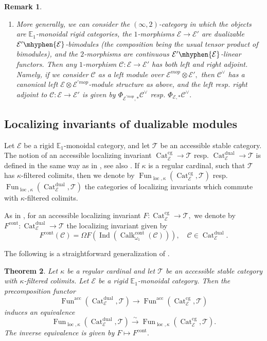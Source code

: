 \documentclass[11pt,leqno]{amsart}
\newtheorem{theo}{Theorem}[section]
\newtheorem{remark}[theo]{Remark}
\numberwithin{equation}{section}
\newcommand{\hy}{\mhyphen}
\newcommand{\xto}{\xrightarrow}
\newcommand{\Cat}{\operatorname{Cat}}
\newcommand{\loc}{\operatorname{loc}}
\newcommand{\cont}{\operatorname{cont}}
\newcommand{\acc}{\operatorname{acc}}
\newcommand{\cg}{\operatorname{cg}}
\newcommand{\dual}{\operatorname{dual}}
\newcommand{\bE}{{\mathbb E}}
\newcommand{\cC}{{\mathcal C}}
\newcommand{\cE}{{\mathcal E}}
\newcommand{\cT}{{\mathcal T}}
\newcommand{\Fun}{\operatorname{Fun}}
\newcommand{\Ind}{\operatorname{Ind}}
\newcommand{\Calk}{\operatorname{Calk}}
\begin{document}
\begin{remark}
\begin{enumerate}[label=(\roman*),ref=(\roman*)]
\item More generally, we can consider the $(\infty,2)$-category in which the objects are $\bE_1$-monoidal rigid categories, the $1$-morphisms $\cE\to\cE'$ are dualizable $\cE'\hy\cE$-bimodules (the composition being the usual tensor product of bimodules), and the $2$-morphisms are continuous $\cE'\hy\cE$-linear functors. Then any $1$-morphism $\cC:\cE\to\cE'$ has both left and right adjoint. Namely, if we consider $\cC$ as a left module over $\cE^{mop}\otimes\cE',$ then $\cC^{\vee}$ has a canonical left $\cE\otimes\cE^{'mop}$-module structure as above, and the left resp. right adjoint to $\cC:\cE\to\cE'$ is given by $\Phi_{\cE^{'mop},*}\cC^{\vee}$ resp. $\Phi_{\cE,*}\cC^{\vee}.$  
\end{enumerate}
\end{remark}

\subsection{Localizing invariants of dualizable modules}

Let $\cE$ be a rigid $\bE_1$-monoidal category, and let $\cT$ be an accessible stable category. The notion of an accessible localizing invariant $\Cat_{\cE}^{\cg}\to \cT$ resp. $\Cat_{\cE}^{\dual}\to\cT$ is defined in the same way as in \cite{BGT}, see also \cite[Section 4]{E24}. If $\kappa$ is a regular cardinal, such that $\cT$ has $\kappa$-filtered colimits, then we denote by $\Fun_{\loc,\kappa}(\Cat_{\cE}^{\cg},\cT)$ resp. $\Fun_{\loc,\kappa}(\Cat_{\cE}^{\dual},\cT)$ the categories of localizing invariants which commute with $\kappa$-filtered colimits.

As in \cite[Definition 4.5]{E24}, for an accessible localizing invariant $F:\Cat_{\cE}^{\cg}\to\cT,$ we denote by $F^{\cont}:\Cat_{\cE}^{\dual}\to\cT$ the localizing invariant given by
\begin{equation*}
F^{\cont}(\cC)=\Omega F(\Ind(\Calk_{\omega_1}^{\cont}(\cC))),\quad \cC\in\Cat_{\cE}^{\dual}.
\end{equation*}

The following is a straightforward generalization of \cite[Theorem 4.10]{E24}.

\begin{theo}\label{th:continuous_loc_invar}
Let $\kappa$ be a regular cardinal and let $\cT$ be an accessible stable category with $\kappa$-filtered colimits. Let $\cE$ be a rigid $\bE_1$-monoidal category. Then the precomposition functor
\begin{equation*}
\Fun^{\acc}(\Cat_{\cE}^{\dual},\cT)\to \Fun^{\acc}(\Cat_{\cE}^{\cg},\cT)
\end{equation*}
induces an equivalence
\begin{equation*}
\Fun_{\loc,\kappa}(\Cat_{\cE}^{\dual},\cT)\xto{\sim} \Fun_{\loc,\kappa}(\Cat_{\cE}^{\cg},\cT).
\end{equation*}
The inverse equivalence is given by $F\mapsto F^{\cont}.$
\end{theo}
\end{document}
